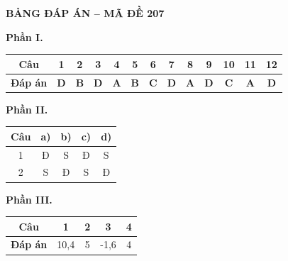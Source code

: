 
\vspace{0.3cm}
\noindent\begin{minipage}{\linewidth}
\begin{center}{\large\bfseries\color{red!80!black} BẢNG ĐÁP ÁN -- MÃ ĐỀ 207}\end{center}
\noindent\textbf{Phần I.}\par\smallskip
\begin{center}\begin{tabular}{|c|c|c|c|c|c|c|c|c|c|c|c|c|}\hline
\textbf{Câu} & 1 & 2 & 3 & 4 & 5 & 6 & 7 & 8 & 9 & 10 & 11 & 12 \\ \hline
\textbf{Đáp án} & \textbf{D} & \textbf{B} & \textbf{D} & \textbf{A} & \textbf{B} & \textbf{C} & \textbf{D} & \textbf{A} & \textbf{D} & \textbf{C} & \textbf{A} & \textbf{D} \\ \hline
\end{tabular}\end{center}
\noindent\textbf{Phần II.}\par\smallskip
\begin{center}\begin{tabular}{|c|c|c|c|c|}\hline
\textbf{Câu} & \textbf{a)} & \textbf{b)} & \textbf{c)} & \textbf{d)} \\ \hline
1 & Đ & S & Đ & S \\ \hline
2 & S & Đ & S & Đ \\ \hline
\end{tabular}\end{center}
\noindent\textbf{Phần III.}\par\smallskip
\begin{center}\begin{tabular}{|c|c|c|c|c|}\hline
\textbf{Câu} & 1 & 2 & 3 & 4 \\ \hline
\textbf{Đáp án} & 10,4 & 5 & -1,6 & 4 \\ \hline
\end{tabular}\end{center}
\end{minipage}
